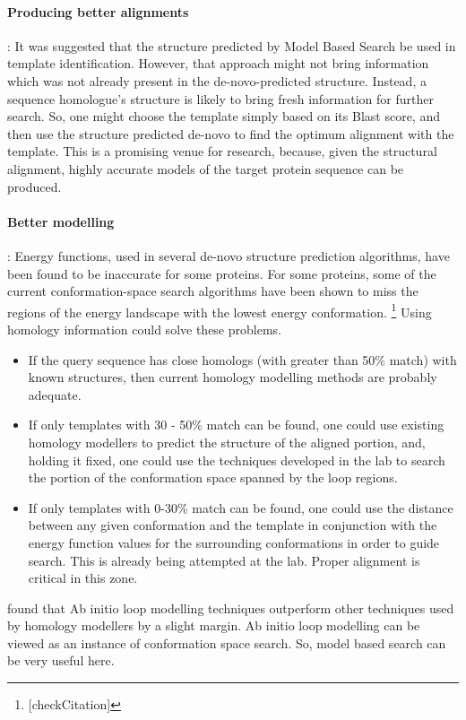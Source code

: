 \documentclass[10pt]{report}
\begin{document}
\paragraph{Producing better alignments}: It was suggested that the structure predicted by Model Based Search be used in template identification. However, that approach might not bring information which was not already present in the de-novo-predicted structure. Instead, a sequence homologue's structure is likely to bring fresh information for further search. So, one might choose the template simply based on its Blast score, and then use the structure predicted de-novo to find the optimum alignment with the template. This is a promising venue for research, because, given the structural alignment, highly accurate models of the target protein sequence can be produced. \cite{zhang05}

\paragraph{Better modelling}: Energy functions, used in several de-novo structure prediction algorithms, have been found to be inaccurate for some proteins. For some proteins, some of the current conformation-space search algorithms have been shown to miss the regions of the energy landscape with the lowest energy conformation. \footnote{[checkCitation]} Using homology information could solve these problems.

\begin{itemize}
 \item If the query sequence has close homologs (with greater than 50\% match) with known structures, then current homology modelling methods are probably adequate.
 \item If only templates with 30 - 50\% match can be found, one could use existing homology modellers to predict the structure of the aligned portion, and, holding it fixed, one could use the techniques developed in the lab to search the portion of the conformation space spanned by the loop regions.
 \item If only templates with 0-30\% match can be found, one could use the distance between any given conformation and the template in conjunction with the energy function values for the surrounding conformations in order to guide search. This is already being attempted at the lab. Proper alignment is critical in this zone.
\end{itemize}

\cite{dalton07} found that Ab initio loop modelling techniques outperform other techniques used by homology modellers by a slight margin. Ab initio loop modelling can be viewed as an instance of conformation space search. So, model based search can be very useful here.
\end{document}

